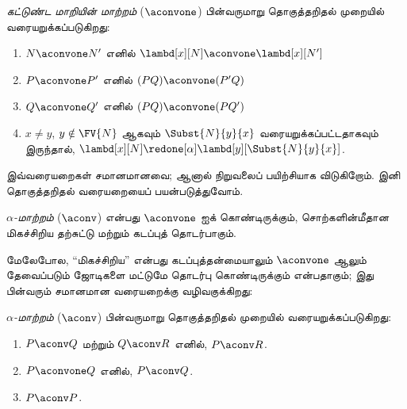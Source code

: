 \documentclass[../../../include/open-logic-section]{subfiles}
\begin{document}
\begin{defn}[கட்டுண்ட மாறியின் மாற்றம், $\aconvone$] 
  \emph{கட்டுண்ட மாறியின் மாற்றம்} ($\aconvone$) பின்வருமாறு தொகுத்தறிதல்
  முறையில் வரையறுக்கப்படுகிறது:
  \begin{enumerate}
  \item $N \aconvone N'$ எனில் $\lambd[x][N] \aconvone
    \lambd[x][N']$ 
  \item $P \aconvone P'$ எனில் $(PQ) \aconvone (P'Q)$ 
  \item $Q \aconvone Q'$ எனில் $(PQ) \aconvone (PQ')$ 
  \item $x \neq y$, $y \notin \FV{N}$ ஆகவும் $\Subst{N}{y}{x}$
    வரையறுக்கப்பட்டதாகவும் இருந்தால்,
    $\lambd[x][N] \redone[\alpha] \lambd[y][\Subst{N}{y}{x}]$.
  \end{enumerate}
\end{defn}

இவ்வரையறைகள் சமானமானவை; ஆனால் நிறுவலைப் பயிற்சியாக விடுகிறோம். இனி
தொகுத்தறிதல் வரையறையைப் பயன்படுத்துவோம்.

\begin{defn}
  \emph{$\alpha$-மாற்றம்} ($\aconv$) என்பது $\aconvone$ ஐக் கொண்டிருக்கும்,
  சொற்களின்மீதான மிகச்சிறிய தற்சுட்டு மற்றும் கடப்புத் தொடர்பாகும்.
\end{defn}

மேலேபோல, ``மிகச்சிறிய'' என்பது கடப்புத்தன்மையாலும் $\aconvone$ ஆலும்
தேவைப்படும் ஜோடிகளை மட்டுமே தொடர்பு கொண்டிருக்கும் என்பதாகும்; இது பின்வரும்
சமானமான வரையறைக்கு வழிவகுக்கிறது:

\begin{defn} 
  \emph{$\alpha$-மாற்றம்} ($\aconv$) பின்வருமாறு தொகுத்தறிதல் முறையில்
  வரையறுக்கப்படுகிறது:
  \begin{enumerate}
  \item $P \aconv Q$ மற்றும் $Q \aconv R$ எனில், $P \aconv R$.
  \item $P \aconvone Q$ எனில், $P \aconv Q$. 
  \item $P \aconv P$. 
  \end{enumerate}
\end{defn}
\end{document}
